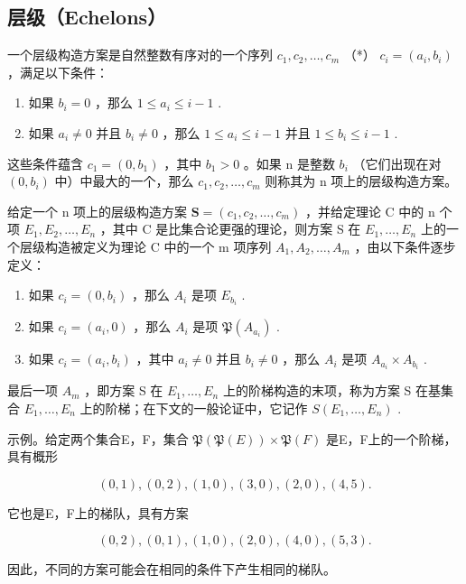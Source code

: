 \subsection{层级（Echelons）}

一个层级构造方案是自然整数有序对的一个序列 \(c_1, c_2, \ldots, c_m\) （*） \(c_i = (a_i, b_i)\) ，满足以下条件：

\begin{enumerate}
\def\labelenumi{(\alph{enumi})}
\item
  如果 \(b_{i} = 0\) ，那么 \(1 \leqslant a_{i} \leqslant i - 1\) .
\item
  如果 \(a_i \neq 0\) 并且 \(b_i \neq 0\) ，那么 \(1 \leqslant a_i \leqslant i - 1\) 并且 \(1 \leqslant b_i \leqslant i - 1\) .
\end{enumerate}

这些条件蕴含 \(c_{1}=(0,b_{1})\) ，其中 \(b_{1}>0\) 。如果 n 是整数 \(b_{i}\) （它们出现在对 \((0,b_{i})\) 中）中最大的一个，那么 \(c_{1},c_{2},\ldots,c_{m}\) 则称其为 n 项上的层级构造方案。

给定一个 n 项上的层级构造方案 \(\mathbf{S} = (c_{1}, c_{2}, \ldots, c_{m})\) ，并给定理论 C 中的 n 个项 \(E_{1}, E_{2}, \ldots, E_{n}\) ，其中 C 是比集合论更强的理论，则方案 S 在 \(E_{1}, \ldots, E_{n}\) 上的一个层级构造被定义为理论 C 中的一个 m 项序列 \(A_{1}, A_{2}, \ldots, A_{m}\) ，由以下条件逐步定义：

\begin{enumerate}
\def\labelenumi{(\alph{enumi})}
\item
  如果 \(c_{i} = (0, b_{i})\) ，那么 \(A_{i}\) 是项 \(E_{b_{i}}\) .
\item
  如果 \(c_{i} = (a_{i}, 0)\) ，那么 \(A_{i}\) 是项 \(\mathfrak{P}(A_{a_i})\) .
\item
  如果 \(c_{i} = (a_{i}, b_{i})\) ，其中 \(a_{i} \neq 0\) 并且 \(b_{i} \neq 0\) ，那么 \(A_{i}\) 是项 \(A_{a_{i}} \times A_{b_{i}}\) .
\end{enumerate}

最后一项 \(A_{m}\) ，即方案 S 在 \(E_{1}, \ldots, E_{n}\) 上的阶梯构造的末项，称为方案 S 在基集合 \(E_{1}, \ldots, E_{n}\) 上的阶梯；在下文的一般论证中，它记作 \(S(E_{1}, \ldots, E_{n})\) .

示例。给定两个集合E，F，集合 \(\mathfrak{P}(\mathfrak{P}(E)) \times \mathfrak{P}(F)\) 是E，F上的一个阶梯，具有概形

\[
(0, 1), (0, 2), (1, 0), (3, 0), (2, 0), (4, 5).
\]

它也是E，F上的梯队，具有方案

\[
(0, 2), (0, 1), (1, 0), (2, 0), (4, 0), (5, 3).
\]

因此，不同的方案可能会在相同的条件下产生相同的梯队。

